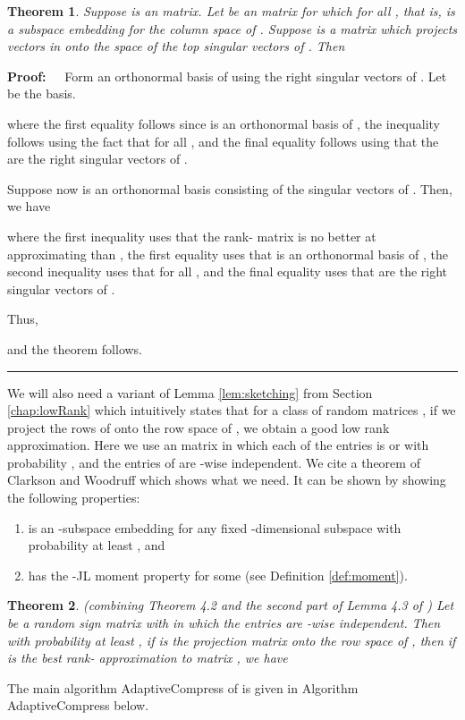 \documentclass[11pt]{article}
\newtheorem{theorem}{Theorem}
\newenvironment{proof}{\begin{trivlist} \item {\bf Proof:~~}}
  {\qed\end{trivlist}}
\def\qed{\hfill\rule{2mm}{2mm}}
\begin{document}
\begin{theorem}\label{thm:kv}
Suppose  is an  matrix. Let  be an  matrix for which
 for all , that is,
 is a subspace embedding for the column space of . Suppose
 is a  matrix which projects vectors in  onto the space of
the top 
singular vectors of . Then

\end{theorem}
\begin{proof}
Form an orthonormal basis of  using the right singular vectors of . Let
 be the basis.

where the first equality follows since  is an orthonormal basis
of ,
the inequality follows using the fact that 
for all , and the final equality follows using that the 
are the right singular vectors of . 

Suppose now  is an orthonormal basis consisting of the singular vectors
of . Then, we have

where the first inequality uses that the rank- matrix  is no better
at approximating  than , the first equality uses that
 is an orthonormal basis of , the second inequality uses
that  for all , 
and the final equality uses that  are the right singular vectors of . 

Thus,

and the theorem follows.
\end{proof}
We will also need a variant of Lemma \ref{lem:sketching} from Section \ref{chap:lowRank}
which intuitively states that for a class of random matrices , if we project
the rows of  onto the row space of , we obtain a good low rank approximation.   
Here we use an  matrix  in which each of the
entries is  or  with probability , 
and the entries of  are -wise independent. We
cite a theorem of Clarkson and Woodruff \cite{CW09} which shows what we need.
It can be shown by showing the following properties:
\begin{enumerate}
\item  is an -subspace embedding for any fixed -dimensional subspace with probability at least , and
\item  has the -JL moment property for some  (see Definition \ref{def:moment}). 
\end{enumerate}
\begin{theorem}\label{thm:sketch}(combining Theorem 4.2 and the second part of Lemma 4.3 of \cite{CW09})
Let  be a random sign matrix with  in which
the entries are -wise independent.
Then with probability at least , if  is the  projection matrix onto the row space of ,
then if  is the best rank- approximation to matrix , we have

\end{theorem}
The main algorithm {\sc AdaptiveCompress} of \cite{kvw14} is given in Algorithm 
{\sf AdaptiveCompress} below.  
\end{document}
